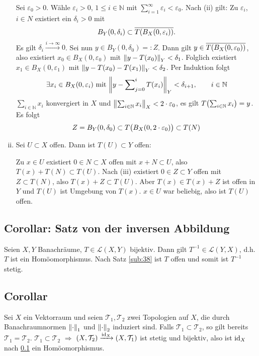 \begin{enumerate}[(i)]
	Sei $\varepsilon_0 >0$. Wähle $\varepsilon_i >0$, $1 \le i \in \mathds{N}$ mit $\sum_{i=1}^{\infty} \varepsilon_i < \varepsilon_0$. Nach (ii) gilt: Zu $\varepsilon_i$, 
	$i \in N$ existiert ein $\delta_i >0$ mit 
	\[
		B_Y(0,\delta_i) \subset \overline{T \enbrace*{B_X(0,\varepsilon_i)}}. 
	\]
	Es gilt $\delta_i \xrightarrow{i \to \infty} 0$. Sei 
	nun $y \in B_Y(0,\delta_0) =: Z$. Dann gilt $y \in \overline{T \enbrace*{B_X(0,\varepsilon_0)}}$, also existiert $x_0 \in B_X(0,\varepsilon_0)$ mit 
	$\norm[Y]{y- T(x_0)}< \delta_1$. Folglich existiert $x_1 \in B_X(0,\varepsilon_1)$ mit $\norm[Y]{y- T(x_0) - T(x_1)} < \delta_2$. Per Induktion folgt
	\[
		\exists x_i \in B_X(0,\varepsilon_i) \text{ mit } \norm[Y]{y- \sum\nolimits_{j=0}^{i}T(x_i)} < \delta_{i+1}, \qquad i \in \mathds{N} 
	\]
	$\sum_{i \in \mathds{N}}x_i$ konvergiert in $X$ und $\norm[X]{\sum_{i\in \mathds{N}} x_i} < 2 \cdot \varepsilon_0 $, es gilt $T \enbrace*{\sum_{i \in \mathds{N}}x_i}=y$.
	Es folgt
	\[
		Z = B_Y(0,\delta_0) \subset {T \enbrace[\big]{B_X(0,2 \cdot \varepsilon_0)} } \subset T(N)
	\]
	\item Sei $U \subset X$ offen. Dann ist $T(U) \subset Y$ offen:
	
	Zu $x \in U$ existiert $0 \in N \subset X$ offen mit $x+ N \subset U$, also $T(x)+ T(N)\subset T(U)$. Nach (iii) existiert $0 \in Z \subset Y$ offen mit $Z \subset T(N)$,
	also $T(x)+ Z \subset T(U)$. Aber $T(x) \in T(x)+ Z$ ist offen in $Y$ und $T(U)$ ist Umgebung von $T(x)$. $x \in U$ war beliebig, also ist $T(U)$ offen. \bewende
\end{enumerate}

\subsection{Corollar: Satz von der inversen Abbildung} %
\label{sub:39}
Seien $X,Y$ Banachräume, $T \in \mathcal{L}(X,Y)$ bijektiv. Dann gilt $T ^{-1} \in \mathcal{L}(Y,X)$, d.h. $T$ ist ein Homöomorphismus.
Nach Satz \ref{sub:38} ist $T$ offen und somit ist $T ^{-1}$ stetig. \bewende

\subsection[Corollar: Gleichheit von Topologien von Banachräumen, wenn $\mathcal{T}_1 \subset \mathcal{T}_2$]{Corollar} %
\label{sub:310}
Sei $X$ ein Vektorraum und seien $\mathcal{T}_1, \mathcal{T}_2$ zwei Topologien auf $X$, die durch Banachraumnormen $\norm[1]{\cdot }$ und $\norm[2]{\cdot}$ induziert sind.
Falls $\mathcal{T}_1 \subset \mathcal{T}_2$, so gilt bereits $\mathcal{T}_1 = \mathcal{T}_2$.
$\mathcal{T}_1 \subset \mathcal{T}_2$ $\Rightarrow $ $(X,\mathcal{T}_2) \xrightarrow{\id_X} (X,\mathcal{T}_1)$ ist stetig und bijektiv, also ist $\id_X$ nach 
\ref{sub:39} ein Homöomorphismus. \bewende

